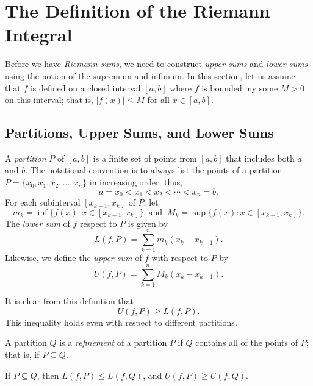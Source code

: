 \section{The Definition of the Riemann Integral}

Before we have \textit{Riemann sums}, we need to construct \textit{upper sums}  and \textit{lower sums} using the notion of the supremum and infimum. In this section, let us assume that \( f  \) is defined on a closed interval \( [a,b]  \) where \( f  \) is bounded my some \( M > 0  \) on this interval; that is, \( | f(x)  | \leq M  \) for all \( x \in [a,b] \). 

\subsection{Partitions, Upper Sums, and Lower Sums}

\begin{definition}
	A \textit{partition} \( P  \) of \( [a,b]  \) is a finite set of points from \( [a,b]  \) that includes both \( a  \) and \( b  \). The notational convention is to always list the points of a partition \( P = \{ x_{0}, x_{1}, x_{2}, \dots, x_{n} \}  \) in increasing order; thus, \[  a = x_{0} < x_{1} < x_{2} < \dotsb < x_{n} = b. \]
	For each subinterval \( [x_{k-1}, x_{k} ] \) of \( P  \), let 
	\[  m_{k } = \inf \{ f(x) : x \in [x_{k-1} , x_{k } ] \} \ \text{ and } \  M_{k } = \sup \{ f(x) : x \in [x_{k-1}, x_{k }] \}. \]
	The \textit{lower sum} of \( f  \) respect to \( P  \) is given by 
	\[  L(f, P ) = \sum_{ k=1 }^{ n } m_{ k } ( x_{k } -  x_{ k -1 }). \]
	Likewise, we define the \textit{upper sum} of \( f  \) with respect to \( P  \) by 
	\[  U(f, P ) = \sum_{ k=1 }^{ n } M_k ( x_{k } - x_{ k -1 }). \]
\end{definition}

It is clear from this definition that 
\[  U(f, P ) \geq L(f, P ).\]  This inequality holds even with respect to different partitions.

\begin{definition}
A partition \( Q  \) is a \textit{refinement} of a partition \( P  \) if \( Q  \) contains all of the points of \( P  \); that is, if \( P \subseteq Q  \).



\end{definition}

\begin{lemma}
If \( P \subseteq Q  \), then \( L(f,P) \leq L(f,Q)  \), and \( U(f,P ) \geq U(f,Q) \).
\end{lemma}

